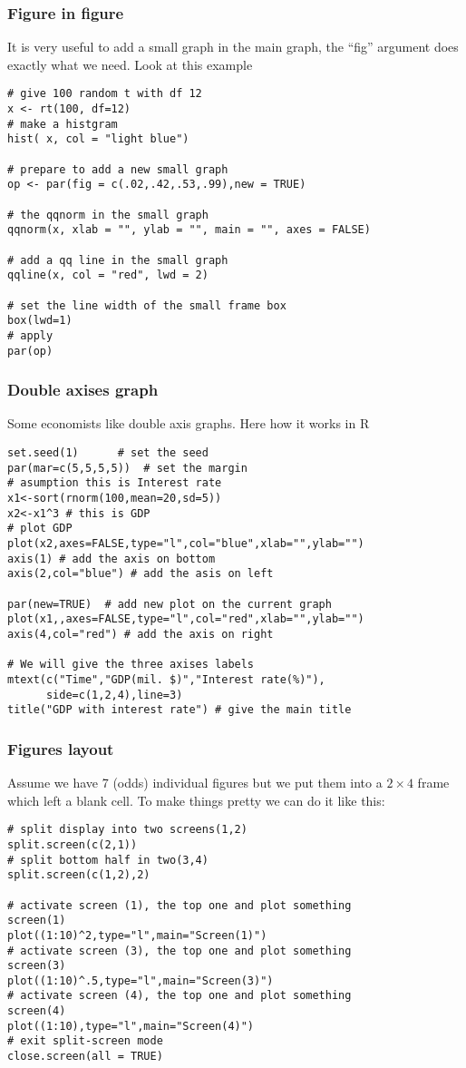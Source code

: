 \documentclass[10pt]{beamer}
\begin{document}
\begin{frame}[fragile]
  \frametitle{Figure in figure}
  It is very useful to add a small graph in the main graph, the
  ``fig'' argument does exactly what we need. Look at this example
\begin{verbatim}
# give 100 random t with df 12
x <- rt(100, df=12)
# make a histgram
hist( x, col = "light blue")

# prepare to add a new small graph
op <- par(fig = c(.02,.42,.53,.99),new = TRUE)

# the qqnorm in the small graph
qqnorm(x, xlab = "", ylab = "", main = "", axes = FALSE)

# add a qq line in the small graph
qqline(x, col = "red", lwd = 2)

# set the line width of the small frame box
box(lwd=1)
# apply
par(op)
\end{verbatim}
\end{frame}


\begin{frame}[fragile]
  \frametitle{Double axises graph}

  Some economists like double axis graphs. Here how it works in R
\begin{verbatim}
set.seed(1)      # set the seed
par(mar=c(5,5,5,5))  # set the margin
# asumption this is Interest rate
x1<-sort(rnorm(100,mean=20,sd=5))
x2<-x1^3 # this is GDP
# plot GDP
plot(x2,axes=FALSE,type="l",col="blue",xlab="",ylab="")
axis(1) # add the axis on bottom
axis(2,col="blue") # add the asis on left

par(new=TRUE)  # add new plot on the current graph
plot(x1,,axes=FALSE,type="l",col="red",xlab="",ylab="")
axis(4,col="red") # add the axis on right

# We will give the three axises labels
mtext(c("Time","GDP(mil. $)","Interest rate(%)"),
      side=c(1,2,4),line=3)
title("GDP with interest rate") # give the main title
\end{verbatim}
\end{frame}

\begin{frame}[fragile]
  \frametitle{Figures layout}

  Assume we have 7 (odds) individual figures but we put them into a
  $2\times 4$ frame which left a blank cell. To make things pretty we
  can do it like this:
\begin{verbatim}
# split display into two screens(1,2)
split.screen(c(2,1))
# split bottom half in two(3,4)
split.screen(c(1,2),2)

# activate screen (1), the top one and plot something
screen(1)
plot((1:10)^2,type="l",main="Screen(1)")
# activate screen (3), the top one and plot something
screen(3)
plot((1:10)^.5,type="l",main="Screen(3)")
# activate screen (4), the top one and plot something
screen(4)
plot((1:10),type="l",main="Screen(4)")
# exit split-screen mode
close.screen(all = TRUE)
\end{verbatim}
\end{frame}
\end{document}
